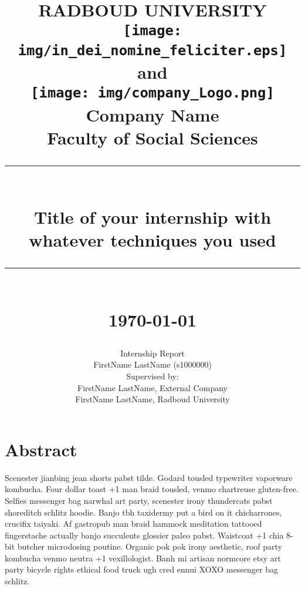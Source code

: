 \documentclass[11pt]{article}
\newcommand{\HRule}[1]{\rule{\linewidth}{#1}}
\begin{document}
\date{}

\title{ \normalsize RADBOUD UNIVERSITY
		\\ [1.0cm]
		\texttt{[image: img/in\_dei\_nomine\_feliciter.eps]}  \\[.5cm]
		and   \\[.5cm]
		\texttt{[image: img/company\_Logo.png]}\\[.5cm]
		\normalsize Company Name \\ [1.0cm]
		Faculty of Social Sciences\\
		\HRule{2pt} \\
		\LARGE \textbf{Title of your internship with whatever techniques you used} %
		\HRule{2pt} \\ [0.5cm]
		\normalsize \today \vspace*{5\baselineskip}}
		
\date{}

\author{
        Internship Report \\[0.5cm]
		FirstName LastName (s1000000)            \\[1cm]
		 Supervised by:        \\
		 FirstName LastName, External Company \\
		 FirstName LastName, Radboud University
		 }
		 
\maketitle

\newpage

\tableofcontents

\section*{Abstract}

Scenester jianbing jean shorts pabst tilde. Godard tousled typewriter vaporware kombucha. Four dollar toast +1 man braid tousled, venmo chartreuse gluten-free. Selfies messenger bag narwhal art party, scenester irony thundercats pabst shoreditch schlitz hoodie. Banjo tbh taxidermy put a bird on it chicharrones, crucifix taiyaki. Af gastropub man braid hammock meditation tattooed fingerstache actually banjo succulents glossier paleo pabst. Waistcoat +1 chia 8-bit butcher microdosing poutine. Organic pok pok irony aesthetic, roof party kombucha venmo neutra +1 vexillologist. Banh mi artisan normcore etsy art party bicycle rights ethical food truck ugh cred ennui XOXO messenger bag schlitz.
\end{document}

